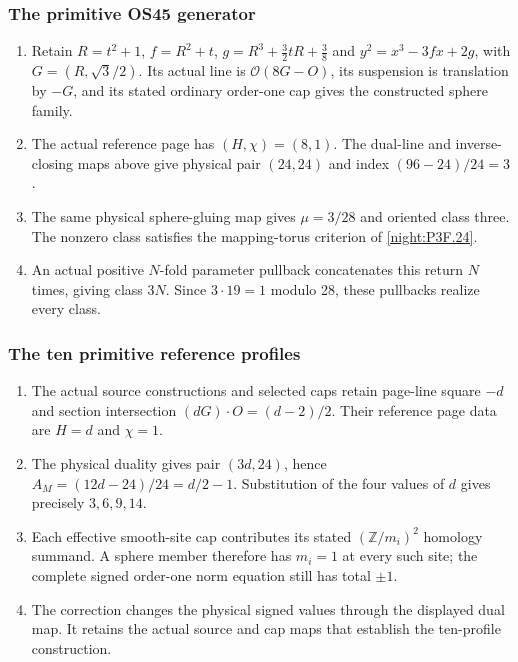 \subsubsection{The primitive OS45 generator}
\RungOne
\begin{enumerate}[label=\arabic*.]
\item Retain $R=t^2+1$, $f=R^2+t$,
  $g=R^3+\tfrac32tR+\tfrac38$ and
  $y^2=x^3-3fx+2g$, with $G=(R,\sqrt3/2)$.
  Its actual line is $\mathcal O(8G-O)$, its suspension is
  translation by $-G$, and its stated ordinary order-one cap
  gives the constructed sphere family.
\item The actual reference page has $(H,\chi)=(8,1)$.
  The dual-line and inverse-closing maps above give physical
  pair $(24,24)$ and index $(96-24)/24=3$.
\item The same physical sphere-gluing map gives
  $\mu=3/28$ and oriented class three. The nonzero class
  satisfies the mapping-torus criterion of \cref{night:P3F.24}.
\item An actual positive $N$-fold parameter pullback concatenates
  this return $N$ times, giving class $3N$. Since
  $3\cdot19=1$ modulo 28, these pullbacks realize every class.
\end{enumerate}

\subsubsection{The ten primitive reference profiles}
\RungOne
\begin{enumerate}[label=\arabic*.]
\item The actual source constructions and selected caps retain
  page-line square $-d$ and section intersection
  $(dG)\cdot O=(d-2)/2$. Their reference page data are
  $H=d$ and $\chi=1$.
\item The physical duality gives pair $(3d,24)$, hence
  $A_M=(12d-24)/24=d/2-1$. Substitution of the four values
  of $d$ gives precisely $3,6,9,14$.
\item Each effective smooth-site cap contributes its stated
  $(\mathbb Z/m_i)^2$ homology summand. A sphere member
  therefore has $m_i=1$ at every such site; the complete
  signed order-one norm equation still has total $\pm1$.
\item The correction changes the physical signed values through
  the displayed dual map. It retains the actual source and cap
  maps that establish the ten-profile construction.
\end{enumerate}

